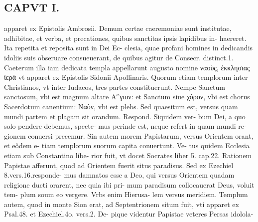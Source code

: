 \documentclass{article}
\begin{document}
\begin{pages}
\section*{CAPVT I. }
\marginpar{[ p.73 ]}\pstart apparet ex Epistolis Ambrosii. Demum certae caeremoniae sunt institutae, adhibitae, et verba, et precationes, quibus sanctitas ipsis lapidibus in- haereret. Ita repetita et reposita sunt in Dei Ec- clesia, quae profani homines in dedicandis idoliis suis obseruare consueuerant, de quibus agitur de Consecr. distinct.1. Caeterum illa iam dedicata templa appellarunt augusto nomine ναοὺς, ἐκκλησιας ἰερὰ vt apparet ex Epistolis Sidonii Apollinaris. Quorum etiam templorum inter Christianos, vt inter Iudaeos, tres partes constituerunt. Nempe Sanctum sanctosum, vbi est magnum altare Aʹ'γιον: et Sanctum siue χόρον, vbi est chorus Sacerdotum canentium: Ναὸν, vbi est plebs.  \pend\pstart Sed quaesitum est, versus quam mundi partem et plagam sit orandum. Respond. Siquidem ver- bum Dei, a quo solo pendere debemus, specte- mus perinde est, neque refert in quam mundi re- gionem conuersi precemur. Sin autem morem Papistarum, versus Orientem orant, et eôdem e- tiam templorum suorum capita conuertunt. Ve- tus quidem Ecclesia etiam sub Constantino libe- rior fuit, vt docet Socrates liber  5. cap.22. Rationem Papistae afferunt, quod ad Orientem fuerit situs paradisus. Sed ex Ezechiel 8.vers.16.responde- mus damnatos esse a Deo, qui versus Orientem quadam religione ducti orarent, nec quia ibi pri- mum paradisum collocauerat Deus, voluit tem- plum soum eo vergere. Vrbs enim Hierusa- lem versus meridiem. Templum autem, quod in monte Sion erat, ad Septentrionem situm fuit, vti apparet ex Psal.48. et Ezechiel.4o. vers.2. De- pique videntur Papistae veteres Persas idolola-  \pend

\end{pages}
\end{document}
